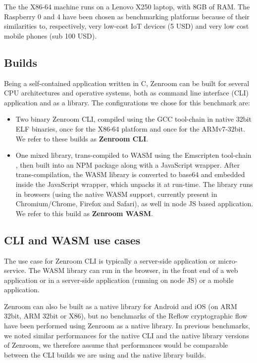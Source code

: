 \documentclass[twocolumn]{article}
\begin{document}
The the X86-64 machine runs on a Lenovo X250 laptop, with 8GB of RAM.  
The Raspberry 0 and 4 have been chosen as benchmarking platforms because of their similarities to, respectively, very low-cost IoT devices (5 USD) and very low cost mobile phones (sub 100 USD).

\subsection*{Builds} 

Being a self-contained application written in C, Zenroom can be built for several CPU architectures and operative systems, both as command line interface (CLI) application and as a library. The configurations we chose for this benchmark are: 

\begin{itemize}
\item Two binary Zenroom CLI, compiled using the GCC tool-chain in native 32bit ELF binaries, once for the X86-64 platform and once for the ARMv7-32bit. We refer to these builds as \textbf{Zenroom CLI}. 

\item One mixed library, trans-compiled to WASM using the Emscripten tool-chain \citep{zakai2011emscripten}, then built into an NPM package along with a JavaScript wrapper. After trans-compilation, the WASM library is converted to base64 and embedded inside the JavaScript wrapper, which unpacks it at run-time. 
The library runs in browsers (using the native WASM support, currently present in Chromium/Chrome, Firefox and Safari), as well in node JS based application. We refer to this build as \textbf{Zenroom WASM}. 
\end{itemize}

\subsection*{CLI and WASM use cases} 

The use case for Zenroom CLI is typically a server-side application or micro-service. The WASM library can run in the browser, in the front end of a web application or in a server-side application (running on node JS) or a mobile application.

Zenroom can also be built as a native library for Android and iOS (on ARM 32bit, ARM 32bit or X86), but no benchmarks of the Reflow cryptographic flow have been performed using Zenroom as a native library. 
In previous benchmarks, we noted similar performances for the native CLI and the native library versions of Zenroom, we therefore assume that performances would be comparable between the CLI builds we are using and the native library builds.
\end{document}
